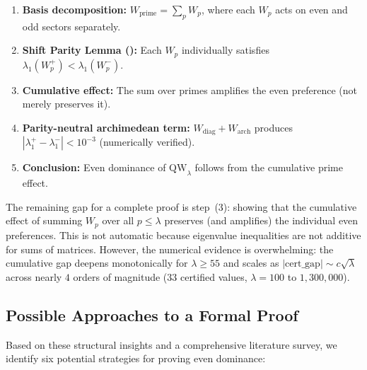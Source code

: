 \documentclass[12pt,a4paper]{article}
\theoremstyle{definition}
\theoremstyle{remark}
\begin{document}
\begin{enumerate}
  \item \textbf{Basis decomposition:} $W_{\mathrm{prime}} = \sum_p W_p$, where each $W_p$ acts on even and odd sectors separately.
  \item \textbf{Shift Parity Lemma ():} Each $W_p$ individually satisfies $\lambda_1(W_p^+) < \lambda_1(W_p^-)$.
  \item \textbf{Cumulative effect:} The sum over primes amplifies the even preference (not merely preserves it).
  \item \textbf{Parity-neutral archimedean term:} $W_{\mathrm{diag}} + W_{\mathrm{arch}}$ produces $|\lambda_1^+ - \lambda_1^-| < 10^{-3}$ (numerically verified).
  \item \textbf{Conclusion:} Even dominance of $\mathrm{QW}_\lambda$ follows from the cumulative prime effect.
\end{enumerate}

\noindent The remaining gap for a complete proof is step~(3): showing that the cumulative effect of summing $W_p$ over all $p \leq \lambda$ preserves (and amplifies) the individual even preferences. This is not automatic because eigenvalue inequalities are not additive for sums of matrices. However, the numerical evidence is overwhelming: the cumulative gap deepens monotonically for $\lambda \geq 55$ and scales as $|\mathrm{cert\_gap}| \sim c\sqrt{\lambda}$ across nearly $4$ orders of magnitude ($33$ certified values, $\lambda = 100$ to $1{,}300{,}000$).

\subsection{Possible Approaches to a Formal Proof}

Based on these structural insights and a comprehensive literature survey, we identify six potential strategies for proving even dominance:
\end{document}

